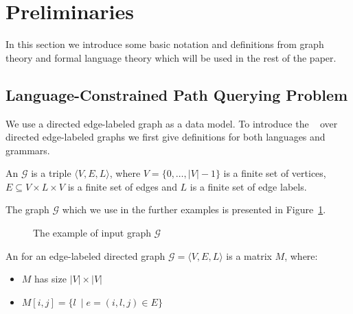 \section{Preliminaries}

In this section we introduce some basic notation and definitions from graph theory and formal language theory which will be used in the rest of the paper.

\subsection{Language-Constrained Path Querying Problem}

We use a directed edge-labeled graph as a data model.
To introduce the ~\citep{barrett2000formal} over directed edge-labeled graphs we first give definitions for both languages and grammars.

\begin{definition}
An  $\mathcal{G}$ is a triple $\langle V,E,L \rangle$, where $V = \{0, \ldots, |V|-1\}$ is a finite set of vertices, $E \subseteq V \times L \times V$ is a finite set of edges and $L$ is a finite set of edge labels.
\end{definition}

The graph  $\mathcal{G}$  which we use in the further examples is presented in Figure~\ref{fig:example_input_graph}.

\begin{figure}[h!]
    \centering
    \caption{The example of input graph $\mathcal{G}$}
    \label{fig:example_input_graph}
\end{figure}

\begin{definition}
An  for an edge-labeled directed graph $\mathcal{G} = \langle V,E,L \rangle$ is a matrix $M$, where:
\begin{itemize}
    \item $M$ has size $|V|\times|V|$
    \item $M[i,j] = \{l~\mid e = (i,l,j) \in E\}$
\end{itemize}
\end{definition}

